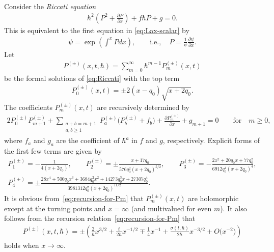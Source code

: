 \documentclass[pdftex]{sigma}
\theoremstyle{definition}
\numberwithin{equation}{section}
\def\p{\partial}
\begin{document}
Consider the {\em Riccati equation}
\begin{gather} \label{eq:Riccati}
\hbar^{2} \left( P^{2} + \frac{\p P}{\p x} \right)
+ f \hbar P + g = 0.
\end{gather}
This is equivalent to the f\/irst equation
in \eqref{eq:Lax-scalar} by
\begin{gather*}
\psi = \exp\left( \int^{x} Pdx \right), \qquad
 \text{i.e.}, \quad P = \frac{1}{\psi} \frac{\p \psi}{\p x}  .
\end{gather*}
Let
\begin{gather*}
P^{(\pm)}(x,t,\hbar) = \sum_{m=0}^{\infty}\hbar^{m-1}P^{(\pm)}_{m}(x,t)
\end{gather*}
be the formal solutions of \eqref{eq:Riccati} with the top term
\begin{gather*} %
P^{(\pm)}_{0}(x,t) = \pm 2(x-q_{0})\sqrt{x+2q_{0}}.
\end{gather*}
The coef\/f\/icients $P^{(\pm)}_{m}(x,t)$ are recursively determined by
\begin{gather} \label{eq:recursion-for-Pm}
2P^{(\pm)}_{0}P^{(\pm)}_{m+1} +
\sum_{\substack{a+b=m+1 \\ a,b \ge 1}}
P^{(\pm)}_{a} \big(P^{(\pm)}_{b} + f_{b}\big) +
\frac{\p P^{(\pm)}_{m}}{\p x} + g_{m+1} = 0 \qquad \text{for} \quad m \ge 0,
\end{gather}
where $f_{a}$ and $g_{a}$ are the coef\/f\/icient of $\hbar^{a}$
in $f$ and $g$, respectively. Explicit forms of the f\/irst few terms
are given by
\begin{gather*}
P^{(\pm)}_{1}   =   -\frac{1}{4(x+2q_{0})}, \qquad
P^{(\pm)}_{2}   =   \pm \frac{x+17q_{0}}{576q_{0}^{2}(x+2q_{0})^{5/2}}, \qquad
P^{(\pm)}_{3}   =   -\frac{2x^{2}+20q_{0}x+77q_{0}^{2}}
{6912q_{0}^{4}(x+2q_{0})^{4}}, \\
P^{(\pm)}_{4}   =   \pm \frac{28x^{4}+500q_{0}x^{3}+
3684q_{0}^{2}x^{2}+14273q_{0}^{3}x+27307q_{0}^{4}}
{3981312 q_{0}^{7}(x+2q_{0})^{11/2}}.
\end{gather*}
It is obvious from~\eqref{eq:recursion-for-Pm}
that $P^{(\pm)}_{m}(x,t)$ are holomorphic except
at the turning points and $x = \infty$
(and multivalued for even $m$).
It also follows from the recursion relation~\eqref{eq:recursion-for-Pm} that
\begin{gather} \label{eq:asymp-P}
P^{(\pm)}(x,t,\hbar)
= \pm \left(\frac{2}{\hbar}x^{3/2} + \frac{t}{2\hbar}x^{-1/2}
\mp \frac{1}{4}x^{-1} + \frac{\sigma(t,\hbar)}{2\hbar} x^{-3/2}
+ O\big(x^{-2}\big) \right)
\end{gather}
holds when $x \rightarrow \infty$.
\end{document}
